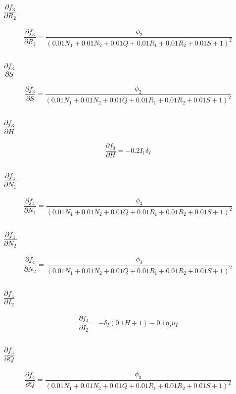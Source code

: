 \documentclass{article}
\begin{document}
\subsection{$\frac{\partial f_{3}}{\partial R_2}$}
\[
\frac{\partial f_{3}}{\partial R_2} = \frac{\phi_{2}}{\left(0.01 N_{1} + 0.01 N_{2} + 0.01 Q + 0.01 R_{1} + 0.01 R_{2} + 0.01 S + 1\right)^{2}}
\]

\subsection{$\frac{\partial f_{3}}{\partial S}$}
\[
\frac{\partial f_{3}}{\partial S} = \frac{\phi_{2}}{\left(0.01 N_{1} + 0.01 N_{2} + 0.01 Q + 0.01 R_{1} + 0.01 R_{2} + 0.01 S + 1\right)^{2}}
\]

\subsection{$\frac{\partial f_{3}}{\partial H}$}
\[
\frac{\partial f_{3}}{\partial H} = - 0.2 I_{1} \delta_{I}
\]

\subsection{$\frac{\partial f_{4}}{\partial N_1}$}
\[
\frac{\partial f_{4}}{\partial N_1} = \frac{\phi_{3}}{\left(0.01 N_{1} + 0.01 N_{2} + 0.01 Q + 0.01 R_{1} + 0.01 R_{2} + 0.01 S + 1\right)^{2}}
\]

\subsection{$\frac{\partial f_{4}}{\partial N_2}$}
\[
\frac{\partial f_{4}}{\partial N_2} = \frac{\phi_{3}}{\left(0.01 N_{1} + 0.01 N_{2} + 0.01 Q + 0.01 R_{1} + 0.01 R_{2} + 0.01 S + 1\right)^{2}}
\]

\subsection{$\frac{\partial f_{4}}{\partial I_2}$}
\[
\frac{\partial f_{4}}{\partial I_2} = - \delta_{I} \left(0.1 H + 1\right) - 0.1 \eta_{I} u_{I}
\]

\subsection{$\frac{\partial f_{4}}{\partial Q}$}
\[
\frac{\partial f_{4}}{\partial Q} = \frac{\phi_{3}}{\left(0.01 N_{1} + 0.01 N_{2} + 0.01 Q + 0.01 R_{1} + 0.01 R_{2} + 0.01 S + 1\right)^{2}}
\]
\end{document}
